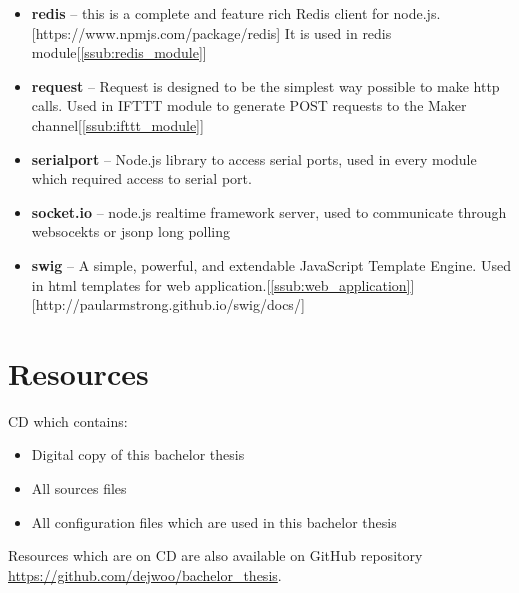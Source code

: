 \begin{itemize}
    \item \textbf{redis} -- this is a complete and feature rich Redis client for node.js.[https://www.npmjs.com/package/redis] It is used in redis module[\ref{ssub:redis_module}]
    \item \textbf{request} -- Request is designed to be the simplest way possible to make http calls. Used in IFTTT module to generate POST requests to the Maker channel[\ref{ssub:ifttt_module}]
    \item \textbf{serialport} -- Node.js library to access serial ports, used in every module which required access to serial port.
    \item \textbf{socket.io} -- node.js realtime framework server, used to communicate through websocekts or jsonp long polling
    \item \textbf{swig} -- A simple, powerful, and extendable JavaScript Template Engine. Used in html templates for web application.[\ref{ssub:web_application}][http://paularmstrong.github.io/swig/docs/]
\end{itemize}


\section{Resources} %
\label{sec:resources}
CD which contains:
\begin{itemize}
\item Digital copy of this bachelor thesis
\item All sources files
\item All configuration files which are used in this bachelor thesis
\end{itemize}
Resources which are on CD are also available on GitHub repository \url{https://github.com/dejwoo/bachelor_thesis}.